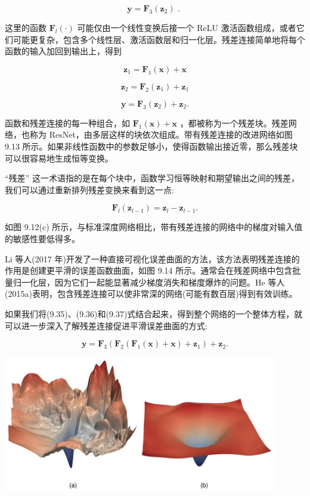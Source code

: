 \documentclass[10pt]{article}
\begin{document}
\[
\mathbf{y} = {\mathbf{F}}_{3}\left( {\mathbf{z}}_{2}\right) \text{ . } \tag{9.34}
\]

这里的函数 \({\mathbf{F}}_{l}\left( \cdot \right)\) 可能仅由一个线性变换后接一个 ReLU 激活函数组成，或者它们可能更复杂，包含多个线性层、激活函数层和归一化层。残差连接简单地将每个函数的输入加回到输出上，得到

\[
{\mathbf{z}}_{1} = {\mathbf{F}}_{1}\left( \mathbf{x}\right)  + \mathbf{x} \tag{9.35}
\]

\[
{\mathbf{z}}_{2} = {\mathbf{F}}_{2}\left( {\mathbf{z}}_{1}\right)  + {\mathbf{z}}_{1} \tag{9.36}
\]

\[
\mathbf{y} = {\mathbf{F}}_{3}\left( {\mathbf{z}}_{2}\right)  + {\mathbf{z}}_{2}. \tag{9.37}
\]

函数和残差连接的每一种组合，如 \({\mathbf{F}}_{1}\left( \mathbf{x}\right)  + \mathbf{x}\) ，都被称为一个残差块。残差网络，也称为 ResNet，由多层这样的块依次组成。带有残差连接的改进网络如图 9.13 所示。如果非线性函数中的参数足够小，使得函数输出接近零，那么残差块可以很容易地生成恒等变换。

“残差” 这一术语指的是在每个块中，函数学习恒等映射和期望输出之间的残差，我们可以通过重新排列残差变换来看到这一点:

\[
{\mathbf{F}}_{l}\left( {\mathbf{z}}_{l - 1}\right)  = {\mathbf{z}}_{l} - {\mathbf{z}}_{l - 1}. \tag{9.38}
\]

如图 9.12(c) 所示，与标准深度网络相比，带有残差连接的网络中的梯度对输入值的敏感性要低得多。

Li 等人(2017 年)开发了一种直接可视化误差曲面的方法，该方法表明残差连接的作用是创建更平滑的误差函数曲面，如图 9.14 所示。通常会在残差网络中包含批量归一化层，因为它们一起能显著减少梯度消失和梯度爆炸的问题。He 等人(2015a)表明，包含残差连接可以使非常深的网络(可能有数百层)得到有效训练。

如果我们将(9.35)、(9.36)和(9.37)式结合起来，得到整个网络的一个整体方程，就可以进一步深入了解残差连接促进平滑误差曲面的方式:

\[
\mathbf{y} = {\mathbf{F}}_{3}\left( {{\mathbf{F}}_{2}\left( {{\mathbf{F}}_{1}\left( \mathbf{x}\right)  + \mathbf{x}}\right)  + {\mathbf{z}}_{1}}\right)  + {\mathbf{z}}_{2}. \tag{9.39}
\]

\begin{center}
\includegraphics[max width=0.9\textwidth]{images/0194e279-9b28-703a-88f4-c3ac21e2010d_295_307_366_1199_595_0.jpg}
\end{center}
\hspace*{3em} 
\end{document}
